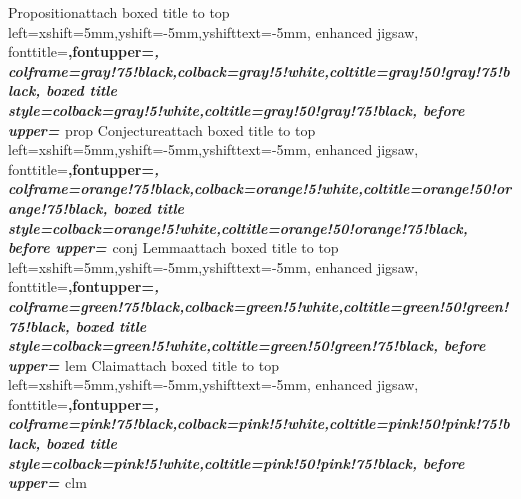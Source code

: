%
{Proposition}{attach boxed title to top 	left={xshift=5mm,yshift=-5mm,yshifttext=-5mm},
	enhanced jigsaw,
	fonttitle=\bfseries\large,fontupper=\itshape,
	colframe=gray!75!black,colback=gray!5!white,coltitle=gray!50!gray!75!black,
	boxed title style={colback=gray!5!white,coltitle=gray!50!gray!75!black},
	before upper={
		}
}{prop}%
%
{Conjecture}{attach boxed title to top 	left={xshift=5mm,yshift=-5mm,yshifttext=-5mm},
	enhanced jigsaw,
	fonttitle=\bfseries\large,fontupper=\slshape,
	colframe=orange!75!black,colback=orange!5!white,coltitle=orange!50!orange!75!black,
	boxed title style={colback=orange!5!white,coltitle=orange!50!orange!75!black},
	before upper={
		}
}{conj}%
%
{Lemma}{attach boxed title to top 	left={xshift=5mm,yshift=-5mm,yshifttext=-5mm},
	enhanced jigsaw,
	fonttitle=\bfseries\large,fontupper=\itshape,
	colframe=green!75!black,colback=green!5!white,coltitle=green!50!green!75!black,
	boxed title style={colback=green!5!white,coltitle=green!50!green!75!black},
	before upper={
		}
}{lem}%
%
{Claim}{attach boxed title to top 	left={xshift=5mm,yshift=-5mm,yshifttext=-5mm},
	enhanced jigsaw,
	fonttitle=\bfseries\large,fontupper=\itshape,
	colframe=pink!75!black,colback=pink!5!white,coltitle=pink!50!pink!75!black,
	boxed title style={colback=pink!5!white,coltitle=pink!50!pink!75!black},
	before upper={
		}
}{clm}%
